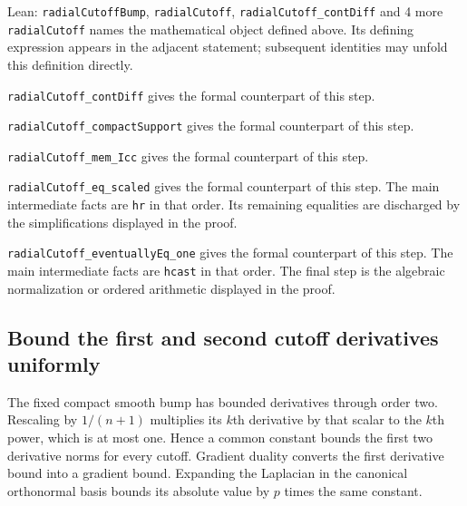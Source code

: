 \documentclass[11pt,a4paper]{report}
\begin{document}
\begin{leanbox}{Lean: \texttt{radialCutoffBump}, \texttt{radialCutoff}, \texttt{radialCutoff\_\allowbreak{}contDiff} and 4 more}
\texttt{radial\allowbreak{}Cutoff} names the mathematical object defined above. Its defining expression appears in the adjacent statement; subsequent identities may unfold this definition directly.




\texttt{radial\allowbreak{}Cutoff\_\allowbreak{}cont\allowbreak{}Diff} gives the formal counterpart of this step.




\texttt{radial\allowbreak{}Cutoff\_\allowbreak{}compact\allowbreak{}Support} gives the formal counterpart of this step.




\texttt{radial\allowbreak{}Cutoff\_\allowbreak{}mem\_\allowbreak{}Icc} gives the formal counterpart of this step.




\texttt{radial\allowbreak{}Cutoff\_\allowbreak{}eq\_\allowbreak{}scaled} gives the formal counterpart of this step. The main intermediate facts are \texttt{hr} in that order. Its remaining equalities are discharged by the simplifications displayed in the proof.




\texttt{radial\allowbreak{}Cutoff\_\allowbreak{}eventually\allowbreak{}Eq\_\allowbreak{}one} gives the formal counterpart of this step. The main intermediate facts are \texttt{hcast} in that order. The final step is the algebraic normalization or ordered arithmetic displayed in the proof.
\end{leanbox}
\subsection{\texorpdfstring{Bound the first and second cutoff derivatives uniformly}{Bound the first and second cutoff derivatives uniformly}}
\label{report-step-AverageLMC-GibbsScoreCutoff-lean-2}


The fixed compact smooth bump has bounded derivatives through order two. Rescaling by \(1/(n+1)\) multiplies its \(k\)th derivative by that scalar to the \(k\)th power, which is at most one. Hence a common constant bounds the first two derivative norms for every cutoff. Gradient duality converts the first derivative bound into a gradient bound. Expanding the Laplacian in the canonical orthonormal basis bounds its absolute value by \(p\) times the same constant.
\end{document}
